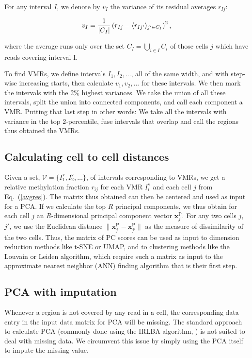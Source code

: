 \documentclass[twocolumn,10pt]{article}
\begin{document}
For any interval $I$, we denote by $v_I$ the variance of its residual averages $r_{Ij}$:

$$ v_I = \frac{\scriptsize{1}}{\scriptsize{|C_I|}}\left( r_{Ij} - \langle r_{Ij'}\rangle_{j'\in C_I} \right)^2,$$

where the average runs only over the set $C_I=\bigcup_{i\in I}C_i$ of those cells $j$ which have reads covering interval I.

To find VMRs, we define intervals $I_1, I_2, ...$, all of the same width, and with step-wise increasing starts, then calculate $v_1, v_2, ...$ for these intervals.
We then mark the intervals with the 2\% highest variances.
We take the union of all these intervals, split the union into connected components, and call each component a VMR.
Putting that last step in other words: We take all the intervals with variance in the top 2-percentile, fuse intervals that overlap and call the regions thus obtained the VMRs.

\subsection{Calculating cell to cell distances}

Given a set, $\mathcal{V}=\{I^\text{v}_1,I^\text{v}_2,\dots\}$, of intervals corresponding to VMRs, we get a relative methylation fraction $r_{ij}$ for each VMR $I^\text{v}_i$ and each cell $j$ from Eq.\ (\ref{avgres}).
The matrix thus obtained can then be centered and used as input for a PCA.
If we calculate the top $R$ principal components, we thus obtain for each cell $j$ an $R$-dimensional principal component vector $\mathbf{x}^\text{P}_j$.
For any two cells $j$, $j'$, we use the Euclidean distance $\|\mathbf{x}^\text{P}_j - \mathbf{x}^\text{P}_{j'}\|$ as the measure of dissimilarity of the two cells.
Thus, the matrix of PC scores can be used as input to dimension reduction methods like t-SNE or UMAP, and to clustering methods like the Louvain or Leiden algorithm, which require such a matrix as input to the approximate nearest neighbor (ANN) finding algorithm that is their first step.

\subsection{PCA with imputation}

Whenever a region is not covered by any read in a cell, the corresponding data entry in the input data matrix for PCA will be missing.
The standard approach to calculate PCA (commonly done using the IRLBA algorithm, \citep{Baglama2005}) is not suited to deal with missing data.
We circumvent this issue by simply using the PCA itself to impute the missing value.
\end{document}
